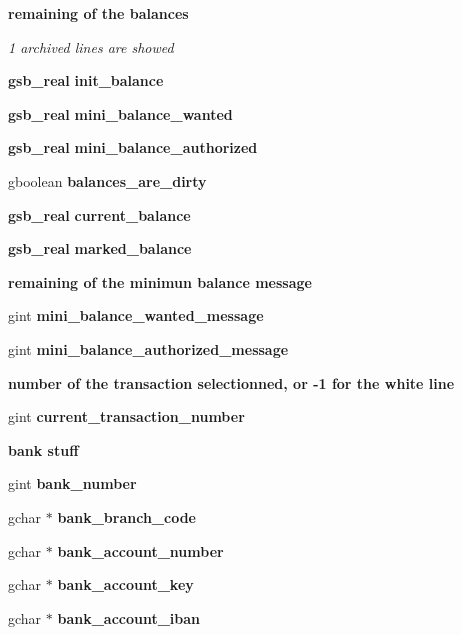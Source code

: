 \begin{Indent}{\bf remaining of the balances}\par
{\em \label{_amgrpb6cec10eb91b95c3207caaafd6b7710d}
 1 archived lines are showed }\begin{DoxyCompactItemize}
\item 
{\bf gsb\_\-real} {\bf init\_\-balance}
\item 
{\bf gsb\_\-real} {\bf mini\_\-balance\_\-wanted}
\item 
{\bf gsb\_\-real} {\bf mini\_\-balance\_\-authorized}
\item 
gboolean {\bf balances\_\-are\_\-dirty}
\item 
{\bf gsb\_\-real} {\bf current\_\-balance}
\item 
{\bf gsb\_\-real} {\bf marked\_\-balance}
\end{DoxyCompactItemize}
\end{Indent}
\begin{Indent}{\bf remaining of the minimun balance message}\par
{\em \label{_amgrp7aa6acae297f051387e29fba5a124fd8}
 }\begin{DoxyCompactItemize}
\item 
gint {\bf mini\_\-balance\_\-wanted\_\-message}
\item 
gint {\bf mini\_\-balance\_\-authorized\_\-message}
\end{DoxyCompactItemize}
\end{Indent}
\begin{Indent}{\bf number of the transaction selectionned, or -\/1 for the white line}\par
{\em \label{_amgrp0b7b781f3844e5e701db75f5dd760294}
 }\begin{DoxyCompactItemize}
\item 
gint {\bf current\_\-transaction\_\-number}
\end{DoxyCompactItemize}
\end{Indent}
\begin{Indent}{\bf bank stuff}\par
{\em \label{_amgrp5768e58285fee2bbb161500171f92f58}
 }\begin{DoxyCompactItemize}
\item 
gint {\bf bank\_\-number}
\item 
gchar $\ast$ {\bf bank\_\-branch\_\-code}
\item 
gchar $\ast$ {\bf bank\_\-account\_\-number}
\item 
gchar $\ast$ {\bf bank\_\-account\_\-key}
\item 
gchar $\ast$ {\bf bank\_\-account\_\-iban}
\end{DoxyCompactItemize}
\end{Indent}
